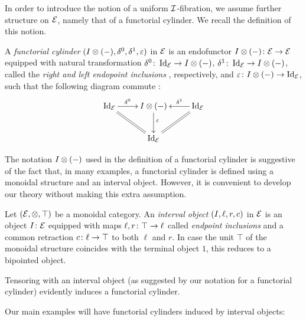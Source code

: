 \documentclass[reqno,10pt,a4paper,oneside,draft]{amsart}
\begin{document}
In order to introduce the notion of a uniform $\cal{I}$-fibration, we assume further structure on $\catE$, namely that of a functorial cylinder.
We recall the definition of this notion.

\begin{definition}
A \emph{functorial cylinder} $(\interval \otimes (-), \lcyl, \rcyl, \ccyl)$ in $\calE$ is an endofunctor $\interval \otimes (-) \co \catE \to \catE$ equipped with natural transformation $\lcyl \co \Id_\catE \to \interval \otimes (-)$, $\rcyl \co \Id_\catE \to \interval \otimes (-)$, called the \emph{right and left endopoint inclusions} , respectively, and $\ccyl \co \interval \otimes (-) \to \Id_\catE$, such that the following diagram commute :
\[
\xymatrix{
  \Id_\catE \ar[r]^-{\lcyl} \ar@{=}[dr] & \interval \otimes (-) \ar[d]^-(.4){\ccyl} & \Id_\catE \ar@{=}[dl] \ar[l]_-{\rcyl} \\
  & \Id_\catE
}
\]
\end{definition}

The notation $\interval \otimes (-)$ used in the definition of a functorial cylinder is suggestive of the fact that, in many examples, a functorial cylinder is defined using a monoidal structure and an interval object.
However, it is convenient to develop our theory without making this extra assumption.

\begin{example} \label{exa:cyl-via-int}
Let $(\catE, \otimes, \top)$ be a monoidal category.
An \emph{interval object} $(\interval, \ell, r, c)$  in $\calE$ is an object $\interval \co \catE$ equipped with maps $\ell, r \co \top \to \intervall$ called \emph{endpoint inclusions} and a common retraction $c \co \intervall \to \top$ to both $\ell$ and $r$.
In case the unit $\top$ of the monoidal structure coincides with the terminal object $1$, this reduces to a bipointed object.

Tensoring with an interval object (as suggested by our notation for a functorial cylinder) evidently induces a functorial cylinder.
\end{example}

Our main examples will have functorial cylinders induced by interval objects:
\end{document}
